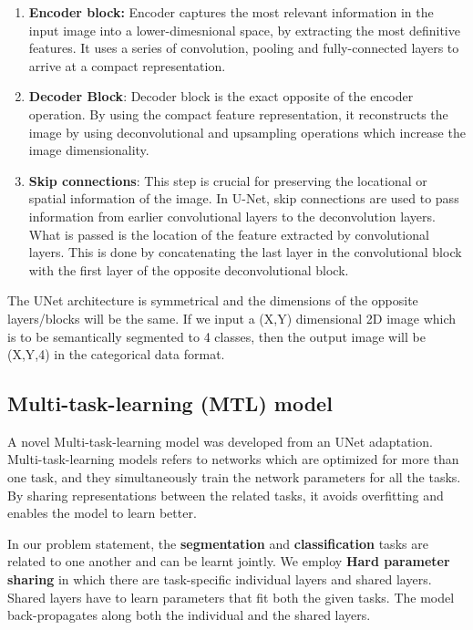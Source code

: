 \begin{enumerate}
    \item \textbf{Encoder block:} Encoder captures the most relevant information in the input image into a lower-dimesnional space, by extracting the most definitive features. It uses a series of convolution, pooling and fully-connected layers to arrive at a compact representation. 
    \item \textbf{Decoder Block}: Decoder block is the exact opposite of the encoder operation. By using the compact feature representation, it reconstructs the image by using deconvolutional and upsampling operations which increase the image dimensionality.
    \item \textbf{Skip connections}: This step is crucial for preserving the locational or spatial information of the image. In U-Net, skip connections are used to pass information from earlier convolutional layers to the deconvolution layers. What is passed is the location of the feature extracted by convolutional layers. This is done by concatenating the last layer in the convolutional block with the first layer of the opposite deconvolutional block.
\end{enumerate}

The UNet architecture is symmetrical and the dimensions of the opposite layers/blocks will be the same. If we input a (X,Y) dimensional 2D image which is to be semantically segmented to 4 classes, then the output image will be (X,Y,4) in the categorical data format.

\subsection{Multi-task-learning (MTL) model}
\vspace*{2mm}
A novel Multi-task-learning model was developed from an UNet adaptation. Multi-task-learning models refers to networks which are optimized for more than one task, and they simultaneously train the network parameters for all the tasks. By sharing representations between the related tasks, it avoids overfitting and enables the model to learn better.
\vspace*{2mm}

In our problem statement, the \textbf{segmentation} and \textbf{classification} tasks are related to one another and can be learnt jointly. We employ \textbf{Hard parameter sharing} in which there are task-specific individual layers and shared layers. Shared layers have to learn parameters that fit both the given tasks. The model back-propagates along both the individual and the shared layers.

